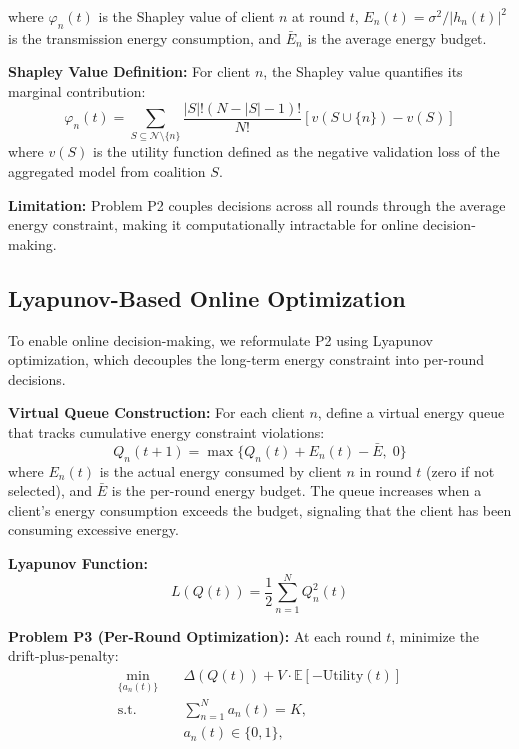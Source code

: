 where $\varphi_n(t)$ is the Shapley value of client $n$ at round $t$, $E_n(t) = \sigma^2 / |h_n(t)|^2$ is the transmission energy consumption, and $\bar{E}_n$ is the average energy budget.

\textbf{Shapley Value Definition:} For client $n$, the Shapley value quantifies its marginal contribution:
\begin{equation}
\varphi_n(t) = \sum_{S \subseteq \mathcal{N} \setminus \{n\}} \frac{|S|! (N - |S| - 1)!}{N!} [v(S \cup \{n\}) - v(S)]
\end{equation}
where $v(S)$ is the utility function defined as the negative validation loss of the aggregated model from coalition $S$.

\textbf{Limitation:} Problem P2 couples decisions across all rounds through the average energy constraint, making it computationally intractable for online decision-making.

\subsection{Lyapunov-Based Online Optimization}

To enable online decision-making, we reformulate P2 using Lyapunov optimization, which decouples the long-term energy constraint into per-round decisions.

\textbf{Virtual Queue Construction:} For each client $n$, define a virtual energy queue that tracks cumulative energy constraint violations:
\begin{equation}
Q_n(t+1) = \max\{Q_n(t) + E_n(t) - \bar{E}, \; 0\}
\end{equation}
where $E_n(t)$ is the actual energy consumed by client $n$ in round $t$ (zero if not selected), and $\bar{E}$ is the per-round energy budget. The queue increases when a client's energy consumption exceeds the budget, signaling that the client has been consuming excessive energy.

\textbf{Lyapunov Function:}
\begin{equation}
L(Q(t)) = \frac{1}{2} \sum_{n=1}^{N} Q_n^2(t)
\end{equation}

\textbf{Problem P3 (Per-Round Optimization):} At each round $t$, minimize the drift-plus-penalty:
\begin{subequations}
\begin{align}
\min_{\{a_n(t)\}} \quad & \Delta(Q(t)) + V \cdot \mathbb{E}[-\text{Utility}(t)] \\
\text{s.t.} \quad & \sum_{n=1}^{N} a_n(t) = K, \\
& a_n(t) \in \{0, 1\},
\end{align}
\end{subequations}

